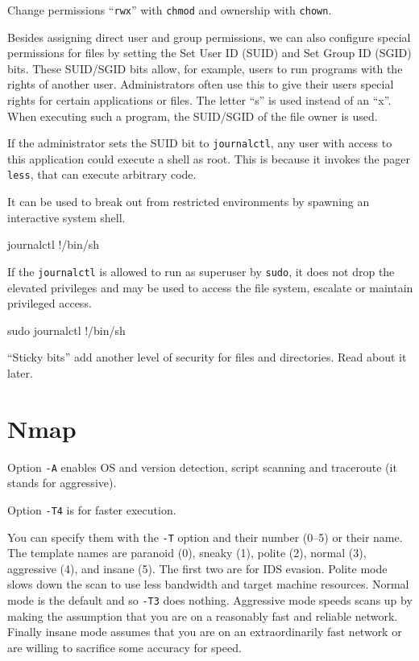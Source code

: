 \documentclass[a4paper,12pt]{article}
\newcommand{\bashinline}[1]{\texttt{#1}}
\begin{document}
Change permissions ``\texttt{rwx}'' with \bashinline{chmod} and ownership with \bashinline{chown}.

\n

Besides assigning direct user and group permissions, we can also configure special permissions for files by setting the Set User ID (SUID) and Set Group ID (SGID) bits. These SUID/SGID bits allow, for example, users to run programs with the rights of another user. Administrators often use this to give their users special rights for certain applications or files. The letter ``s'' is used instead of an ``x''. When executing such a program, the SUID/SGID of the file owner is used.

\n
If the administrator sets the SUID bit to \bashinline{journalctl}, any user with access to this application could execute a shell as root. This is because it invokes the pager \bashinline{less}, that can execute arbitrary code.

It can be used to break out from restricted environments by spawning an interactive system shell.
\begin{bash}
journalctl
!/bin/sh
\end{bash}

If the \bashinline{journalctl} is allowed to run as superuser by \bashinline{sudo}, it does not drop the elevated privileges and may be used to access the file system, escalate or maintain privileged access.
\begin{bash}
sudo journalctl
!/bin/sh
\end{bash}

``Sticky bits'' add another level of security for files and directories. Read about it later.

\pagebreak

\section{Nmap}

Option \bashinline{-A} enables OS and version detection, script scanning and traceroute (it stands for aggressive).

\n

Option \bashinline{-T4} is for faster execution.

\n

You can specify them with the \bashinline{-T} option and their number (0–5) or their name. The template names are paranoid (0),
sneaky (1), polite (2), normal (3), aggressive (4), and insane (5). The first two are for IDS evasion. Polite mode slows down the scan to use less bandwidth and target machine resources. Normal mode is the default and
so \bashinline{-T3} does nothing. Aggressive mode speeds scans up by making the assumption that you are on a reasonably fast and reliable network. Finally insane mode assumes that you are on an extraordinarily fast network or are
willing to sacrifice some accuracy for speed.
\end{document}
